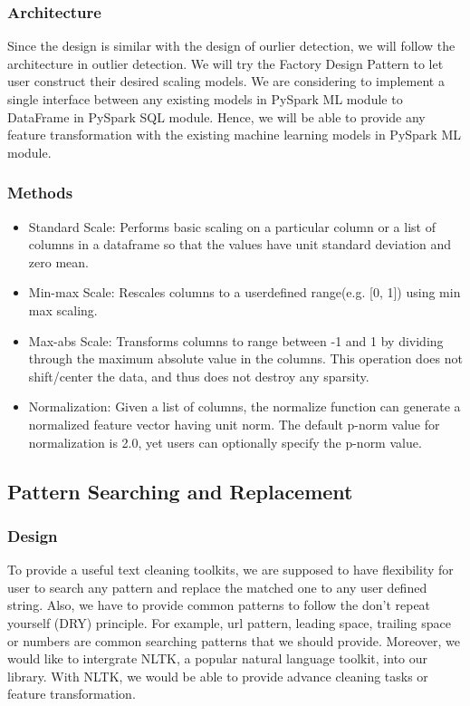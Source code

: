\documentclass[sigconf]{acmart}
\begin{document}
\subsubsection{Architecture}
Since the design is similar with the design of ourlier detection, we will follow the architecture in outlier detection. We will try the Factory Design Pattern to let user construct their desired scaling models. We are considering to implement a single interface between any existing models in PySpark ML module to DataFrame in PySpark SQL module. Hence, we will be able to provide any feature transformation with the existing machine learning models in PySpark ML module.

\subsubsection{Methods}
\begin{itemize}
	\item{Standard Scale}: Performs basic scaling on a particular column or a list of columns in a dataframe so that the values have unit standard deviation and zero mean. 
	\item{Min-max Scale}: Rescales columns to a user\-defined range(e.g. [0, 1]) using min max scaling.
	\item{Max-abs Scale}: Transforms columns to range between -1 and 1 by dividing through the maximum absolute value in the columns. This operation does not shift/center the data, and thus does not destroy any sparsity. 
	\item{Normalization}: Given a list of columns, the normalize function can generate a normalized feature vector having unit norm. The default p-norm value for normalization is 2.0, yet users can optionally specify the p-norm value.
\end{itemize}

\subsection{Pattern Searching and Replacement}
\subsubsection{Design} 
To provide a useful text cleaning toolkits, we are supposed to have flexibility for user to search any pattern and replace the matched one to any user defined string. Also, we have to provide common patterns to follow the don't repeat yourself (DRY) principle. For example, url pattern, leading space, trailing space or numbers are common searching patterns that we should provide. Moreover, we would like to intergrate NLTK\cite{nltk}, a popular natural language toolkit, into our library. With NLTK, we would be able to provide advance cleaning tasks or feature transformation.
\end{document}
